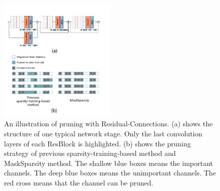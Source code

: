 \documentclass[review]{cvpr}
\begin{document}
   
\begin{figure}[h!]
	\begin{centering}
		\includegraphics[width=0.5\textwidth]{figure/resduial_prune.pdf}
		\caption{
			An illustration of pruning with Residual-Connections.
			(a) shows the structure of one typical network stage. Only the last convolution layers of each ResBlock is highlighted. 
			(b) shows the pruning strategy of previous sparsity-training-based method and MaskSparsity method.
			The shallow blue boxes means the important channels.
			The deep blue boxes means the unimportant channels.
			The red cross means that the channel can be pruned.
		}
	    \label{Pruningmask-method}
	\end{centering}
    
\end{figure}
\end{document}
